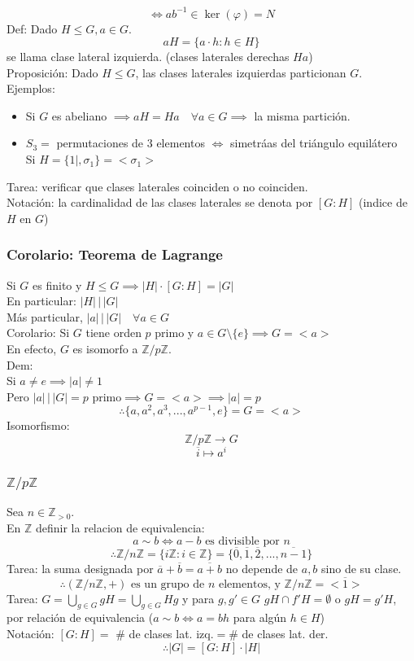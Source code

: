 \documentclass[11pt]{book}
\theoremstyle{definition}
\begin{document}
\[
\iff ab^{-1}\in \ker(\varphi)=N
\]
Def: Dado $H\leq G,a \in G$.
\[
aH=\{a\cdot h:h\in H\}
\]
se llama clase lateral izquierda. (clases laterales derechas $Ha$)\\
Proposición: Dado $H\leq G$, las clases laterales izquierdas particionan $G$.\\
Ejemplos:
\begin{itemize}
	\item Si $G$ es abeliano $\implies aH=Ha\quad \forall a\in G\implies$ la misma partición.
	
	\item $S_3=$ permutaciones de $3$ elementos $\iff$ simetrá­as del triángulo equilátero\\
	Si $H=\{1|,\sigma_1\}=<\sigma_1>$
\end{itemize}
Tarea: verificar que clases laterales coinciden o no coinciden.\\
Notación: la cardinalidad de las clases laterales se denota por $\left[G:H\right]$ (indice de $H$ en $G$)
\subsubsection{Corolario: Teorema de Lagrange}
Si $G$ es finito y $H\leq G\implies |H|\cdot [G:H]=|G|$\\
En particular: $|H|\, |\,|G|$\\
Más particular, $|a| \, |\,|G|\quad \forall a \in G$\\
Corolario: Si $G$ tiene orden $p$ primo y $a\in G\setminus\{e\}\implies G=<a>$\\
En efecto, $G$ es isomorfo a $\mathbb{Z}/p\mathbb{Z}$.\\
Dem:\\
Si $a\neq e\implies |a|\neq 1$\\
Pero $|a|\, |\, |G|=p\textrm{ primo}\implies G=<a>\implies |a|=p$
\[
\therefore \{a,a^2,a^3,...,a^{p-1},e\}=G=<a>
\]
Isomorfismo:
\[
\mathbb{Z}/p\mathbb{Z}\rightarrow G
\]
\[
\overline{i}\mapsto a^i
\]

\subsubsection{$\mathbb{Z}/p\mathbb{Z}$}
Sea $n\in\mathbb{Z}_{>0}$.\\
En $\mathbb{Z}$ definir la relacion de equivalencia:
\[
a\sim b\iff a-b\textrm{ es divisible por } n
\]
\[
\therefore \mathbb{Z}/n\mathbb{Z}=\{i\mathbb{Z}:i\in\mathbb{Z}\}=\{\overline{0},\overline{1},\overline{2},...,\overline{n-1}\}
\]
Tarea: la suma designada por $\overline{a}+\overline{b}=\overline{a+b}$ no depende de $a,b$ sino de su clase.
\[
\therefore (\mathbb{Z}/n\mathbb{Z},+)\textrm{ es un grupo de $n$ elementos, y $\mathbb{Z}/n\mathbb{Z}=<\overline{1}>$}
\]
Tarea: $G=\bigcup_{g\in G}gH=\bigcup_{g\in G}Hg$ y para $g,g'\in G$ $gH\cap f'H=\emptyset$ o $gH=g'H$, por relación de equivalencia ($a\sim b\iff a=bh$ para algún $h\in H$)\\
Notación: $[G:H]=$ \# de clases lat. izq.$=$\# de clases lat. der.
\[
\therefore |G|=[G:H]\cdot |H|
\]
\end{document}
